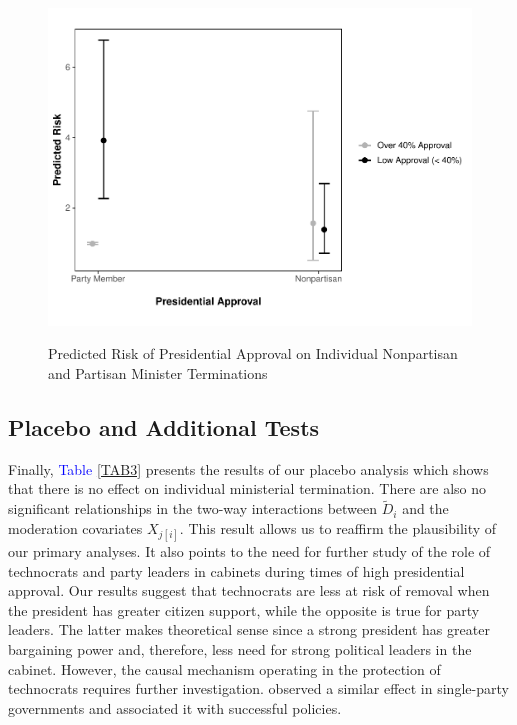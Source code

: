 \documentclass[12pt,halfline,a4paper]{ouparticle}
\begin{document}
\begin{figure}[ht]
\caption{Predicted Risk of Presidential Approval on Individual Nonpartisan and Partisan Minister Terminations}
\label{FIG3}
\centering %
\includegraphics[width=0.9\linewidth]{figures/risk_scores.pdf} \\ %
\end{figure}

\subsection{Placebo and Additional Tests}
\label{sec4.3}

Finally, \textcolor{blue}{Table} \ref{TAB3} presents the results of our placebo analysis which shows that there is no effect on individual ministerial termination. There are also no significant relationships in the two-way interactions between $\widetilde{D}_{i}$ and the moderation covariates $X_{j[i]}$. This result allows us to reaffirm the plausibility of our primary analyses. It also points to the need for further study of the role of technocrats and party leaders in cabinets during times of high presidential approval. Our results suggest that technocrats are less at risk of removal when the president has greater citizen support, while the opposite is true for party leaders. The latter makes theoretical sense since a strong president has greater bargaining power and, therefore, less need for strong political leaders in the cabinet. However, the causal mechanism operating in the protection of technocrats requires further investigation. \cite{Camerlo2015b} observed a similar effect in single-party governments and associated it with successful policies.
\end{document}
